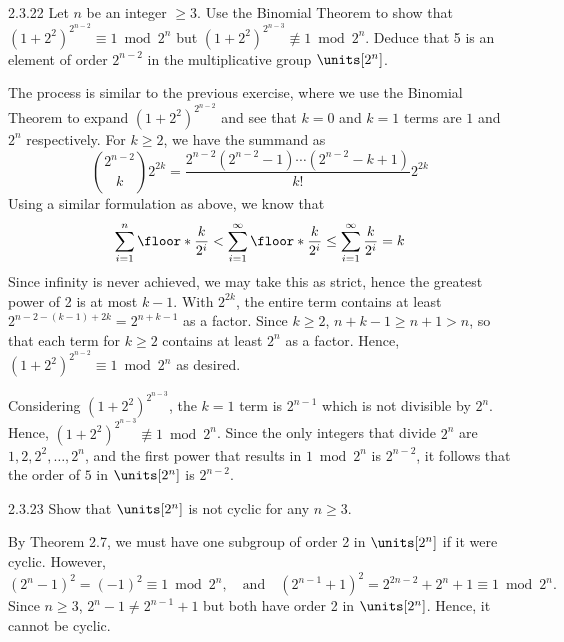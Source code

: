 \begin{spex}{2.3.22}
    Let $n$ be an integer $\geq 3$.
	Use the Binomial Theorem to show that $(1 + 2^2)^{2^{n - 2}} \equiv 1 \bmod 2^n$ but $(1 + 2^2)^{2^{n - 3}} \not\equiv 1 \bmod 2^n$.
	Deduce that 5 is an element of order $2^{n - 2}$ in the multiplicative group $\units[2^n]$.
\end{spex}

\begin{sol}[spsol]
    The process is similar to the previous exercise, where we use the Binomial Theorem to expand $(1 + 2^2)^{2^{n - 2}}$ and see that $k = 0$ and $k = 1$ terms are $1$ and $2^n$ respectively.
	For $k \geq 2$, we have the summand as
    \[
    	\binom{2^{n - 2}}k 2^{2k} = \frac{2^{n - 2}(2^{n - 2} - 1) \cdots (2^{n - 2} - k + 1)}{k!} 2^{2k}
    \]
    Using a similar formulation as above, we know that
    \[
    	\sum_{i = 1}^n \floor*{\frac{k}{2^i}} < \sum_{i = 1}^\infty \floor*{\frac{k}{2^i}} \leq \sum_{i = 1}^\infty \frac{k}{2^i} = k
    \]
    Since infinity is never achieved, we may take this as strict, hence the greatest power of 2 is at most $k - 1$.
	With $2^{2k}$, the entire term contains at least $2^{n - 2 - (k - 1) + 2k} = 2^{n + k - 1}$ as a factor.
	Since $k \geq 2$, $n + k - 1 \geq n + 1 > n$, so that each term for $k \geq 2$ contains at least $2^n$ as a factor.
	Hence, $(1 + 2^2)^{2^{n - 2}} \equiv 1 \bmod 2^n$ as desired.
	
    Considering $(1 + 2^2)^{2^{n - 3}}$, the $k = 1$ term is $2^{n - 1}$ which is not divisible by $2^n$.
	Hence, $(1 + 2^2)^{2^{n - 3}} \not\equiv 1 \bmod 2^n$.
	Since the only integers that divide $2^n$ are $1, 2, 2^2, \ldots, 2^n$, and the first power that results in $1 \bmod 2^n$ is $2^{n - 2}$, it follows that the order of $5$ in $\units[2^n]$ is $2^{n - 2}$.
\end{sol}

\begin{exercise}{2.3.23}
    Show that $\units[2^n]$ is not cyclic for any $n \ge 3$.
    
\end{exercise}

\begin{sol}
    By Theorem 2.7, we must have one subgroup of order 2 in $\units[2^n]$ if it were cyclic.
	However,
    \[
    	(2^n - 1)^2 = (-1)^2 \equiv 1 \bmod 2^n, \quad \text{and} \quad (2^{n - 1} + 1)^2 = 2^{2n - 2} + 2^n + 1 \equiv 1 \bmod 2^n.
    \]
    Since $n \geq 3$, $2^n - 1 \neq 2^{n - 1} + 1$ but both have order 2 in $\units[2^n]$.
	Hence, it cannot be cyclic.
\end{sol}

